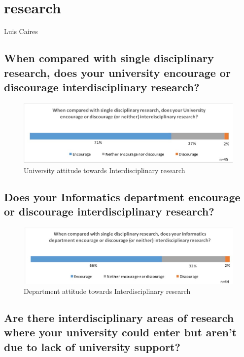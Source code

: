 \section{research}

Luis Caires

\subsection{When compared with single disciplinary research, does your university encourage or discourage interdisciplinary research?}

\begin{figure}[h]
\centering
\includegraphics[width = \linewidth]{charts/1a.jpg}
\caption{University attitude towards Interdisciplinary research}
\label{sect1:Uattitude}
\end{figure}

\subsection{Does your Informatics department encourage or discourage interdisciplinary research? }

\begin{figure}[h]
\centering
\includegraphics[width = \linewidth]{charts/1b.jpg}
\caption{Department attitude towards Interdisciplinary research}
\label{sect1:Dattitude}
\end{figure}

\subsection{Are there interdisciplinary areas of research where your university
could enter but aren't due to lack of university support?}

